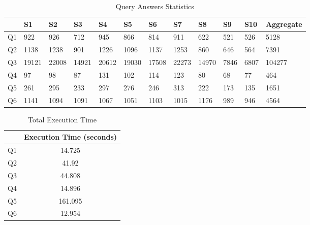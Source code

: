 \documentclass[11pt]{report}
\begin{document}
\begin{table}[htbp]
 \begin{center}
 \caption{Query Answers Statistics}
  \label{tab:answer}
\begin{tabular}{|l|l|l|l|l|l|l|l|l|l|l|l|}
\hline
  & S1 & S2 & S3 & S4 & S5 & S6 & S7 & S8 & S9 & S10 & Aggregate\\
  \hline
  \hline
Q1  & 922 & 926 & 712 & 945 & 866 & 814 & 911 & 622 & 521 & 526 & 5128\\
  \hline
Q2  & 1138 & 1238 & 901 & 1226 & 1096 & 1137 & 1253 & 860 & 646 & 564 & 7391 \\
  \hline
Q3  & 19121 & 22008 & 14921 & 20612 & 19030 & 17508 & 22273 & 14970 & 7846 & 6807 & 104277\\
  \hline
Q4  & 97 & 98 & 87 & 131 & 102 & 114 & 123 & 80 & 68 & 77 & 464\\
  \hline
Q5  & 261 & 295 & 233 & 297 & 276 & 246 & 313 & 222 & 173 & 135 & 1651\\
  \hline
Q6  & 1141 & 1094 & 1091 & 1067 & 1051 & 1103 & 1015 & 1176 & 989 & 946 & 4564 \\
  \hline
\end{tabular}
\end{center}
\end{table}

\begin{table}[htbp]
 \begin{center}
 \caption{Total Execution Time}
  \label{tab:time}
\begin{tabular}{|l|c|}
\hline
  & Execution Time (seconds) \\
  \hline
Q1  & 14.725 \\
  \hline
Q2  & 41.92 \\
  \hline
Q3  & 44.808 \\
  \hline
Q4  & 14.896 \\
  \hline
Q5  & 161.095 \\
  \hline
Q6  & 12.954  \\
  \hline
\end{tabular}
\end{center}
\end{table}
\end{document}
